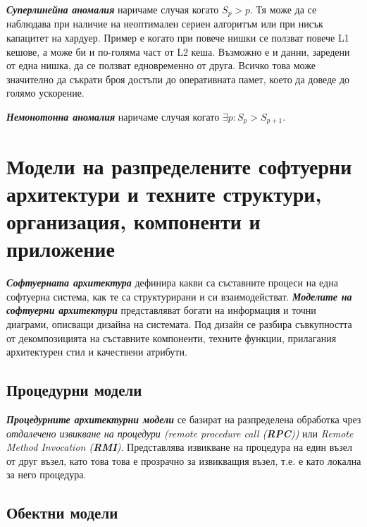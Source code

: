 \documentclass[fleqn,12pt]{article}
\begin{document}
\textbf{\textit{Суперлинейна аномалия}} наричаме случая когато $S_p > p$.
Тя може да се наблюдава при наличие на неоптимален сериен алгоритъм или при нисък капацитет на хардуер.
Пример е когато при повече нишки се ползват повече L1 кешове, а може би и по-голяма част от L2 кеша. Възможно е и данни, 
заредени от една нишка, да се ползват едновременно от друга. Всичко това може значително да съкрати броя достъпи до оперативната памет, което да доведе до голямо ускорение.

\textbf{\textit{Немонотонна аномалия}} наричаме случая когато $\exists p: S_p > S_{p+1}$.

\section{Модели на разпределените софтуерни архитектури и техните структури, организация, компоненти и приложение}


\textbf{\textit{Софтуерната архитектура}} дефинира какви са съставните процеси на една софтуерна система, как те са структурирани и си взаимодействат.
\textbf{\textit{Моделите на софтуерни архитектури}} представляват богати на информация и точни диаграми, описващи дизайна на системата.
Под дизайн се разбира съвкупността от декомпозицията на съставните компоненти, техните функции, прилагания архитектурен стил и качествени атрибути.

\subsection{Процедурни модели}

\textbf{\textit{Процедурните архитектурни модели}} се базират на разпределена обработка чрез \textit{отдалечено извикване на процедури (remote procedure call (\textbf{RPC}))} или \textit{Remote Method Invocation (\textbf{RMI})}.
Представлява извикване на процедура на един възел от друг възел, като това това е прозрачно за извикващия възел, т.е. е като локална за него процедура.

\subsection{Обектни модели}
\end{document}
